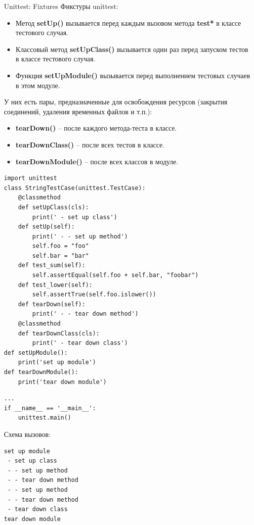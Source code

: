 \documentclass[xcolor=table]{beamer}
\begin{document}
\begin{frame}[t, fragile]{Unittest: Fixtures}
	\linespread{1.0}
	Фикстуры unittest:
	\begin{itemize}
		\item Метод \textbf{setUp()} вызывается перед каждым вызовом метода \textbf{test*} в классе тестового случая.
		\item Классовый метод \textbf{setUpClass()} вызывается один раз перед запуском тестов в классе тестового случая.
		\item Функция \textbf{setUpModule()} вызывается перед выполнением тестовых случаев в этом модуле.
	\end{itemize}		
	У них есть пары, предназначенные для освобождения ресурсов (закрытия соединений, удаления временных файлов и т.п.):
	\begin{itemize}
		\item \textbf{tearDown()} – после каждого метода-теста в классе.
		\item \textbf{tearDownClass()} – после всех тестов в классе.
		\item \textbf{tearDownModule()} – после всех классов в модуле.
	\end{itemize}		
\end{frame}

\begin{frame}[t, fragile]
	\linespread{0.8}
	\begin{verbatim}
import unittest
class StringTestCase(unittest.TestCase):
    @classmethod
    def setUpClass(cls):
        print(' - set up class')
    def setUp(self):
        print(' - - set up method')
        self.foo = "foo"
        self.bar = "bar"
    def test_sum(self):
        self.assertEqual(self.foo + self.bar, "foobar")
    def test_lower(self):
        self.assertTrue(self.foo.islower())
    def tearDown(self):
        print(' - - tear down method')
    @classmethod
    def tearDownClass(cls):
        print(' - tear down class')
def setUpModule():
    print('set up module')
def tearDownModule():
    print('tear down module')
	\end{verbatim}
\end{frame}

\begin{frame}[t, fragile]
	\linespread{0.8}
	\begin{verbatim}
...
if __name__ == '__main__':
    unittest.main()		
	\end{verbatim}
	
	\medskip
	
	Схема вызовов:
	\begin{verbatim}
set up module
 - set up class 
 - - set up method
 - - tear down method
 - - set up method
 - - tear down method
 - tear down class
tear down module
	\end{verbatim}
\end{frame}
\end{document}
